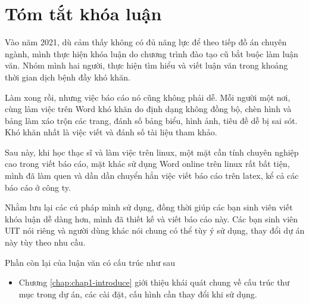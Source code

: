 \chapter*{\centering\Large{Tóm tắt khóa luận}}

Vào năm 2021, dù cảm thấy không có đủ năng lực để theo tiếp đồ án chuyên ngành, mình thực hiện khóa luận do chương trình đào tạo cũ bắt buộc làm luận văn. Nhóm mình hai người, thực hiện tìm hiểu và viết luận văn trong khoảng thời gian dịch bệnh đầy khó khăn.

Làm xong rồi, nhưng việc báo cáo nó cũng không phải dễ. Mỗi người một nơi, cùng làm việc trên Word khó khăn do định dạng không đồng bộ, chèn hình và bảng làm xáo trộn các trang, đánh số bảng biểu, hình ảnh, tiêu đề dễ bị sai sót. Khó khăn nhất là việc viết và đánh số tài liệu tham khảo.

Sau này, khi học thạc sĩ và làm việc trên linux, một mặt cần tính chuyên nghiệp cao trong viết báo cáo, mặt khác sử dụng Word online trên linux rất bất tiện, mình đã làm quen và dần dần chuyển hẳn việc viết báo cáo trên latex, kể cả các báo cáo ở công ty.

Nhằm lưu lại các cú pháp mình sử dụng, đồng thời giúp các bạn sinh viên viết khóa luận dễ dàng hơn, mình đã thiết kế và viết báo cáo này. Các bạn sinh viên UIT nói riêng và người dùng khác nói chung có thể tùy ý sử dụng, thay đổi dự án này tùy theo nhu cầu.

Phần còn lại của luận văn có cấu trúc như sau
\begin{itemize}
    \item Chương \ref{chap:chap1-introduce} giới thiệu khái quát chung về cấu trúc thư mục trong dự án, các cài đặt, cấu hình cần thay đổi khi sử dụng.
\end{itemize}